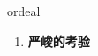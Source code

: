 
\begin{frame}
{\huge ordeal}
\begin{center}
\begin{enumerate}\Large
  \item \textbf{严峻的考验}
\end{enumerate}
\end{center}
\end{frame}
